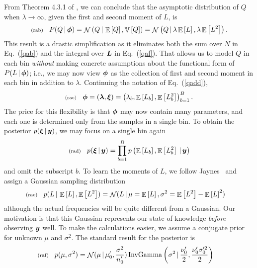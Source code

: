 \documentclass[11pt]{article}
\newcommand{\lleq}[1]{\label{#1} }
\renewcommand{\lleq}[1]{\label{#1} {\scriptstyle {\rm (#1)}} \hspace*{2ex} }
\newcommand{\cond}{\,|\,}
\newcommand{\refeq}[1]{Eq.~(\ref{#1})}
\DeclareMathOperator{\Expect}{\mathbb{E}}
\newcommand{\expect}[1]{\Expect\left[#1\right]}
\DeclareMathOperator{\GaussianDist}{\mathcal{N}}
\DeclareMathOperator{\InvGammaDist}{InvGamma}
\newcommand{\Lumtot}{Q}
\newcommand{\Lum}{L}
\DeclareMathOperator{\Variance}{\mathbb{V}}
\newcommand{\variance}[1]{\Variance\left[#1\right]}
\begin{document}
From Theorem 4.3.1 of \cite{bening2002generalized}, we can conclude
that the asymptotic distribution of $\Lumtot$ when
$\lambda \to \infty$, given the first and second moment of $\Lum$, is
\begin{align}
  \lleq{rab}
  P(\Lumtot \cond \bmphi) = \GaussianDist \left( \Lumtot \cond \expect{Q}, \variance{Q} \right) = \GaussianDist \left( \Lumtot \cond \lambda \expect{\Lum}, \lambda \expect{\Lum^2} \right).
\end{align}
This result is a drastic simplification as it eliminates both the sum over $N$ in \refeq{qab} and the integral over ${\bm{L}}$ in \refeq{qaf}.
That allows us to model $\Lumtot$ in each bin \emph{without} making concrete
assumptions about the functional form of $P(\Lum \cond \bmphi)$; i.e., we may now view ${\bm{\phi}}$ as the collection of first and second moment in each bin in addition to $\lambda$. Continuing the notation of \refeq{qadd},
\begin{align}
  \lleq{rac}
  \bmphi =  \left( \bmlambda, \bmxi \right) = \left(\lambda_b, \expect{\Lum_b}, \expect{\Lum^2_b} \right)_{b=1}^B.
\end{align}
The price for this flexibility is that ${\bm{\phi}}$ may now contain many
parameters, and each one is determined only from the samples in a
single bin. To obtain the posterior $p(\bmxi \cond \bmy)$, we may focus on
a single bin again
\begin{align}
  \lleq{rad}
  p(\bmxi \cond \bmy) = \prod_{b=1}^B p\left(\expect{\Lum_b}, \expect{\Lum^2_b} \cond \bmy\right)
\end{align}
and omit the subscript $b$. To learn the moments of $\Lum$, we follow
Jaynes~\cite[Ch. 7.10]{jaynes2003probability} and assign a Gaussian
sampling distribution
\begin{align}
  \lleq{rae}
  p(\Lum \cond \expect{\Lum}, \expect{\Lum^2} )
  &= \GaussianDist(\Lum \cond \mu = \expect{\Lum}, \sigma^2
  = \expect{\Lum^2} - \expect{\Lum}^2)
\end{align}
although the actual frequencies will be quite different from a
Gaussian. Our motivation is that this Gaussian represents our state of
knowledge \emph{before} observing ${\bm{y}}$ well. To make the
calculations easier, we assume a conjugate prior for unknown $\mu$ and
$\sigma^2$. The standard result for the posterior is
\begin{align}
  \lleq{raf}
  p(\mu, \sigma^2) &= \GaussianDist(\mu \cond \mu_0^\prime, \frac{\sigma^2}{n_0^\prime}) \InvGammaDist\left( \sigma^2 \cond \frac{\nu_0^\prime}{2}, \frac{\nu_0^\prime \sigma_0^{\prime 2}}{2} \right)
\end{align}
\end{document}
